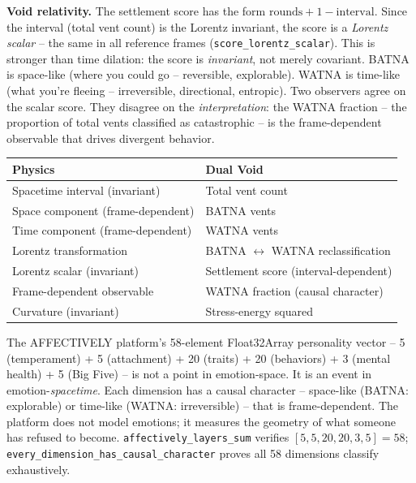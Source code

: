 \documentclass[
  11pt,
]{article}
\newcounter{none} %
\begin{document}
\textbf{Void relativity.} The settlement score has the form
\(\text{rounds} + 1 - \text{interval}\). Since the interval (total vent
count) is the Lorentz invariant, the score is a \emph{Lorentz scalar} --
the same in all reference frames (\texttt{score\_lorentz\_scalar}). This
is stronger than time dilation: the score is \emph{invariant}, not
merely covariant. BATNA is space-like (where you could go -- reversible,
explorable). WATNA is time-like (what you're fleeing -- irreversible,
directional, entropic). Two observers agree on the scalar score. They
disagree on the \emph{interpretation}: the WATNA fraction -- the
proportion of total vents classified as catastrophic -- is the
frame-dependent observable that drives divergent behavior.

{\def\LTcaptype{none} %
\begin{longtable}[]{@{}
  >{\raggedright\arraybackslash}p{}
  >{\raggedright\arraybackslash}p{}@{}}
\toprule\noalign{}
\begin{minipage}[b]{\linewidth}\raggedright
Physics
\end{minipage} & \begin{minipage}[b]{\linewidth}\raggedright
Dual Void
\end{minipage} \\
\midrule\noalign{}
\endhead
\bottomrule\noalign{}
\endlastfoot
Spacetime interval (invariant) & Total vent count \\
Space component (frame-dependent) & BATNA vents \\
Time component (frame-dependent) & WATNA vents \\
Lorentz transformation & BATNA \(\leftrightarrow\) WATNA
reclassification \\
Lorentz scalar (invariant) & Settlement score (interval-dependent) \\
Frame-dependent observable & WATNA fraction (causal character) \\
Curvature (invariant) & Stress-energy squared \\
\end{longtable}
}

The AFFECTIVELY platform's 58-element Float32Array personality vector --
5 (temperament) + 5 (attachment) + 20 (traits) + 20 (behaviors) + 3
(mental health) + 5 (Big Five) -- is not a point in emotion-space. It is
an event in emotion-\emph{spacetime}. Each dimension has a causal
character -- space-like (BATNA: explorable) or time-like (WATNA:
irreversible) -- that is frame-dependent. The platform does not model
emotions; it measures the geometry of what someone has refused to
become. \texttt{affectively\_layers\_sum} verifies
\([5, 5, 20, 20, 3, 5] = 58\);
\texttt{every\_dimension\_has\_causal\_character} proves all 58
dimensions classify exhaustively.
\end{document}
